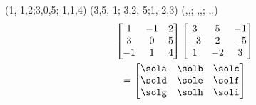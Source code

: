 \MATRIXPRODUCT(1,-1,2;3,0,5;-1,1,4)%
              (3,5,-1;-3,2,-5;1,-2,3)%
                (\sola,\solb,\solc;
                 \sold,\sole,\solf;
                 \solg,\solh,\soli)
\begin{multline*}
\begin{bmatrix}
       1 & -1 & 2 \\ 3 & 0 & 5 \\ -1 & 1 & 4
     \end{bmatrix}
\begin{bmatrix}
       3 & 5 & -1 \\ -3 & 2 & -5 \\ 1 & -2 & 3
     \end{bmatrix}\\
=\begin{bmatrix}
       \sola & \solb & \solc \\
       \sold & \sole & \solf \\
       \solg & \solh & \soli
\end{bmatrix}
\end{multline*}
